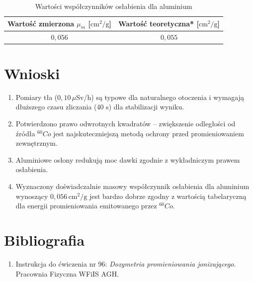 \documentclass{article}
\begin{document}
\begin{table}[H]
\centering
\caption{Wartości współczynników osłabienia dla aluminium}
\renewcommand{\arraystretch}{1.5}
\begin{tabular}{|c|c|}
\hline
\textbf{Wartość zmierzona} $\mu_m$ [$\text{cm}^2/\text{g}$] & \textbf{Wartość teoretyczna*} [$\text{cm}^2/\text{g}$] \\ \hline
$0,056$ & $0,055$ \\ \hline

\end{tabular}
\end{table}




















                



\section{Wnioski}
\begin{enumerate}
    \item Pomiary tła ($0,10 \, \mu$Sv/h) są typowe dla naturalnego otoczenia i wymagają dłuższego czasu zliczania (40 s) dla stabilizacji wyniku.
    \item Potwierdzono prawo odwrotnych kwadratów – zwiększenie odległości od źródła $^{60}Co$ jest najskuteczniejszą metodą ochrony przed promieniowaniem zewnętrznym.
    \item Aluminiowe osłony redukują moc dawki zgodnie z wykładniczym prawem osłabienia.
    \item Wyznaczony doświadczalnie masowy współczynnik osłabienia dla aluminium wynoszący $0,056 \, \text{cm}^2/\text{g}$ jest bardzo dobrze zgodny z wartością tabelaryczną dla energii promieniowania emitowanego przez $^{60}Co$.
\end{enumerate}
\section{Bibliografia}
\begin{enumerate}
    \item Instrukcja do ćwiczenia nr 96: \textit{Dozymetria promieniowania jonizującego}. Pracownia Fizyczna WFiIS AGH.
\end{enumerate}
\end{document}
